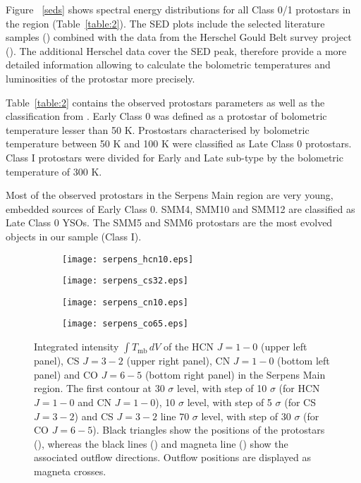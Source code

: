 \documentclass{aa}
\begin{document}
Figure ~\ref{seds} shows spectral energy distributions for all Class 0/1 protostars in the region (Table~\ref{table:2}). The SED plots include the selected literature samples (\citealt{Dun15}) combined with the data from the Herschel Gould Belt survey project (\citealt{And10}). The additional Herschel data cover the SED peak, therefore provide a more detailed information allowing to calculate the bolometric temperatures and luminosities of the protostar more precisely.

Table~\ref{table:2} contains the observed protostars parameters as well as the classification from \citealt{Eno09}. Early Class 0 was defined as a protostar of bolometric temperature lesser than 50 K. Prostostars characterised by bolometric temperature between 50 K and 100 K were classified as Late Class 0 protostars. Class I protostars were divided for Early and Late sub-type by the bolometric temperature of 300 K.

Most of the observed protostars in the Serpens Main region are very young, embedded sources of Early Class 0. SMM4, SMM10 and SMM12 are classified as Late Class 0 YSOs. The SMM5 and SMM6 protostars are the most evolved objects in our sample (Class I). 

\begin{figure*}

\centering
 \begin{subfigure}{.45\textwidth}
  \label{1map}
  \centering
  \texttt{[image: serpens\_hcn10.eps]}
  \caption{}
 \end{subfigure}
 \begin{subfigure}{.45\textwidth}
  \label{2map}
  \centering
  \texttt{[image: serpens\_cs32.eps]}
  \caption{}
 \end{subfigure}
 \begin{subfigure}{.45\textwidth}
  \label{3map}
  \centering
  \texttt{[image: serpens\_cn10.eps]}
  \caption{}
 \end{subfigure}
 \begin{subfigure}{.45\textwidth}
  \label{4map}
  \centering
  \texttt{[image: serpens\_co65.eps]}
  \caption{}
 \end{subfigure}
\caption{Integrated intensity $\int T_\mathrm{mb}\,dV$ of the HCN $J=1-0$ (upper left panel), CS $J=3-2$ (upper right panel), CN $J=1-0$ (bottom left panel) and CO $J=6-5$ (bottom right panel) in the Serpens Main region. The first contour at 30 $\sigma$ level, with step of 10 $\sigma$ (for HCN $J=1-0$ and CN $J=1-0$), 10 $\sigma$ level, with step of 5 $\sigma$ (for CS $J=3-2$) and CS $J=3-2$ line 70 $\sigma$ level, with step of 30 $\sigma$ (for CO $J=6-5$). Black triangles show the positions of the protostars (\citealt{Sur16}), whereas the black lines (\citealt{Yil15}) and magneta line (\citealt{Dio10}) show the associated outflow directions. Outflow positions are displayed as magneta crosses.}
\label{3maps}
\end{figure*}
\end{document}
